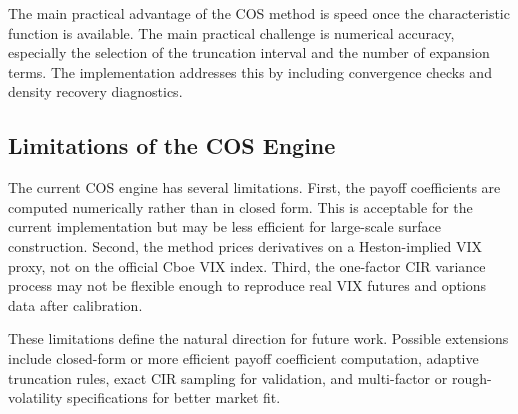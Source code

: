 The main practical advantage of the COS method is speed once the characteristic function is available. The main practical challenge is numerical accuracy, especially the selection of the truncation interval and the number of expansion terms. The implementation addresses this by including convergence checks and density recovery diagnostics.

\subsection{Limitations of the COS Engine}

The current COS engine has several limitations. First, the payoff coefficients are computed numerically rather than in closed form. This is acceptable for the current implementation but may be less efficient for large-scale surface construction. Second, the method prices derivatives on a Heston-implied VIX proxy, not on the official Cboe VIX index. Third, the one-factor CIR variance process may not be flexible enough to reproduce real VIX futures and options data after calibration.

These limitations define the natural direction for future work. Possible extensions include closed-form or more efficient payoff coefficient computation, adaptive truncation rules, exact CIR sampling for validation, and multi-factor or rough-volatility specifications for better market fit.